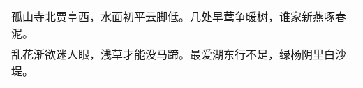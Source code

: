 \nopagebreak%
\nopagebreak%
\noindent\begin{minipage}{\linewidth}
  \vskip-3pt\begin{table}[H]
    \centering
    \begin{tabular}{@{}l@{}}
孤山寺北贾亭西，水面初平云脚低。几处早莺争暖树，谁家新燕啄春泥。\\
乱花渐欲迷人眼，浅草才能没马蹄。最爱湖东行不足，绿杨阴里白沙堤。
    \end{tabular}
  \end{table}
\end{minipage}
\vspace{1cm}


\nopagebreak%
\nopagebreak%
